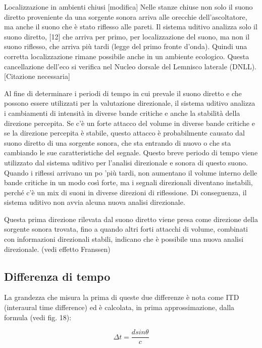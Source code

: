 {Localizzazione in ambienti chiusi [modifica]
Nelle stanze chiuse non solo il suono diretto proveniente da una sorgente sonora arriva alle orecchie dell'ascoltatore, ma anche il suono che è stato riflesso alle pareti. Il sistema uditivo analizza solo il suono diretto, [12] che arriva per primo, per localizzazione del suono, ma non il suono riflesso, che arriva più tardi (legge del primo fronte d'onda). Quindi una corretta localizzazione rimane possibile anche in un ambiente ecologico. Questa cancellazione dell'eco si verifica nel Nucleo dorsale del Lemnisco laterale (DNLL). [Citazione necessaria]

Al fine di determinare i periodi di tempo in cui prevale il suono diretto e che possono essere utilizzati per la valutazione direzionale, il sistema uditivo analizza i cambiamenti di intensità in diverse bande critiche e anche la stabilità della direzione percepita. Se c'è un forte attacco del volume in diverse bande critiche e se la direzione percepita è stabile, questo attacco è probabilmente causato dal suono diretto di una sorgente sonora, che sta entrando di nuovo o che sta cambiando le sue caratteristiche del segnale. Questo breve periodo di tempo viene utilizzato dal sistema uditivo per l'analisi direzionale e sonora di questo suono. Quando i riflessi arrivano un po 'più tardi, non aumentano il volume interno delle bande critiche in un modo così forte, ma i segnali direzionali diventano instabili, perché c'è un mix di suoni in diverse direzioni di riflessione. Di conseguenza, il sistema uditivo non avvia alcuna nuova analisi direzionale.

Questa prima direzione rilevata dal suono diretto viene presa come direzione della sorgente sonora trovata, fino a quando altri forti attacchi di volume, combinati con informazioni direzionali stabili, indicano che è possibile una nuova analisi direzionale. (vedi effetto Franssen)







\subsection{Differenza di tempo}

La grandezza che misura la prima di queste due differenze è nota come
ITD (interaural time difference) ed è calcolata, in prima approssimazione,
dalla formula (vedi fig. 18):

\begin{equation}
\Delta t = \frac{d sin\theta}{c}
\end{equation}

}
